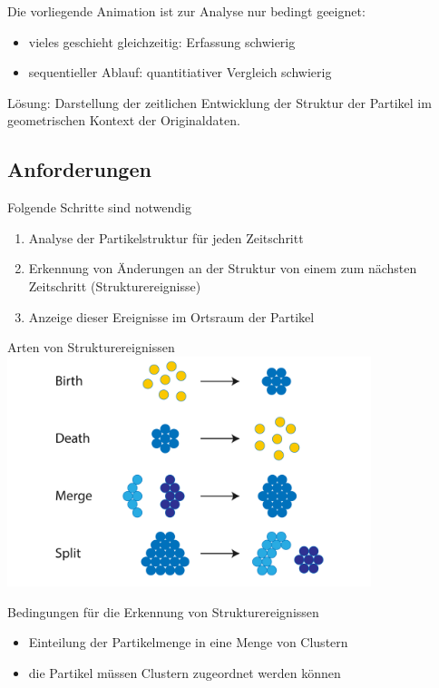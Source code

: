 \documentclass[10pt]{beamer}
\begin{document}
\begin{frame}
	Die vorliegende Animation ist zur Analyse nur bedingt geeignet:
	\begin{itemize}
		\item vieles geschieht gleichzeitig: Erfassung schwierig
		\item sequentieller Ablauf: quantitiativer Vergleich schwierig
	\end{itemize}
	Lösung: Darstellung der zeitlichen Entwicklung der Struktur der Partikel im geometrischen Kontext der Originaldaten.
\end{frame}

\subsection{Anforderungen}

\begin{frame}
	Folgende Schritte sind notwendig
	\begin{enumerate}
		\item Analyse der Partikelstruktur für jeden Zeitschritt
		\item Erkennung von Änderungen an der Struktur von einem zum nächsten Zeitschritt (Strukturereignisse)
		\item Anzeige dieser Ereignisse im Ortsraum der Partikel
	\end{enumerate}
\end{frame}

\begin{frame}{Arten von Strukturereignissen}
	\includegraphics*[height=6.7cm]{media/Strukturereignisse.png}
\end{frame}

\begin{frame}{Bedingungen für die Erkennung von Strukturereignissen}
	\begin{itemize}
		\item Einteilung der Partikelmenge in eine Menge von Clustern
		\item die Partikel müssen Clustern zugeordnet werden können
	\end{itemize}
\end{frame}
\end{document}
